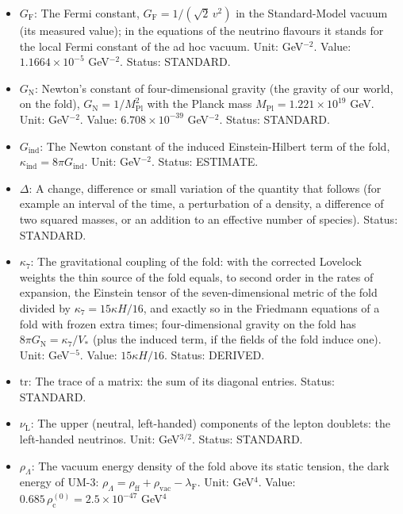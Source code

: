 \documentclass[
  10pt,
]{article}
\providecommand{\tightlist}{%
  \setlength{\itemsep}{0pt}\setlength{\parskip}{0pt}}
\begin{document}
\begin{itemize}
\tightlist
\item
  \(G_{\mathrm{F}}\): The Fermi constant,
  \(G_{\mathrm{F}} = 1/(\sqrt2\,v^2)\) in the Standard-Model vacuum (its
  measured value); in the equations of the neutrino flavours it stands
  for the local Fermi constant of the ad hoc vacuum. Unit: GeV\(^{-2}\).
  Value: \(1.1664\times10^{-5}\) GeV\(^{-2}\). Status: STANDARD.
\item
  \(G_{\mathrm{N}}\): Newton's constant of four-dimensional gravity (the
  gravity of our world, on the fold),
  \(G_{\mathrm{N}} = 1/M_{\mathrm{Pl}}^2\) with the Planck mass
  \(M_{\mathrm{Pl}} = 1.221\times10^{19}\) GeV. Unit: GeV\(^{-2}\).
  Value: \(6.708\times10^{-39}\) GeV\(^{-2}\). Status: STANDARD.
\item
  \(G_{\mathrm{ind}}\): The Newton constant of the induced
  Einstein-Hilbert term of the fold,
  \(\kappa_{\mathrm{ind}} = 8\pi G_{\mathrm{ind}}\). Unit: GeV\(^{-2}\).
  Status: ESTIMATE.
\item
  \(\Delta\): A change, difference or small variation of the quantity
  that follows (for example an interval of the time, a perturbation of a
  density, a difference of two squared masses, or an addition to an
  effective number of species). Status: STANDARD.
\item
  \(\kappa_7\): The gravitational coupling of the fold: with the
  corrected Lovelock weights the thin source of the fold equals, to
  second order in the rates of expansion, the Einstein tensor of the
  seven-dimensional metric of the fold divided by
  \(\kappa_7 = 15\kappa H/16\), and exactly so in the Friedmann
  equations of a fold with frozen extra times; four-dimensional gravity
  on the fold has \(8\pi G_{\mathrm{N}} = \kappa_7/V_*\) (plus the
  induced term, if the fields of the fold induce one). Unit:
  GeV\(^{-5}\). Value: \(15\kappa H/16\). Status: DERIVED.
\item
  \(\mathrm{tr}\): The trace of a matrix: the sum of its diagonal
  entries. Status: STANDARD.
\item
  \(\nu_{\mathrm{L}}\): The upper (neutral, left-handed) components of
  the lepton doublets: the left-handed neutrinos. Unit: GeV\(^{3/2}\).
  Status: STANDARD.
\item
  \(\rho_\Lambda\): The vacuum energy density of the fold above its
  static tension, the dark energy of UM-3:
  \(\rho_\Lambda = \rho_{\mathrm{ff}} + \rho_{\mathrm{vac}} - \lambda_{\mathrm{F}}\).
  Unit: GeV\(^4\). Value:
  \(0.685\,\rho_{\mathrm{c}}^{(0)} = 2.5\times10^{-47}\) GeV\(^4\)

\end{itemize}
\end{document}
